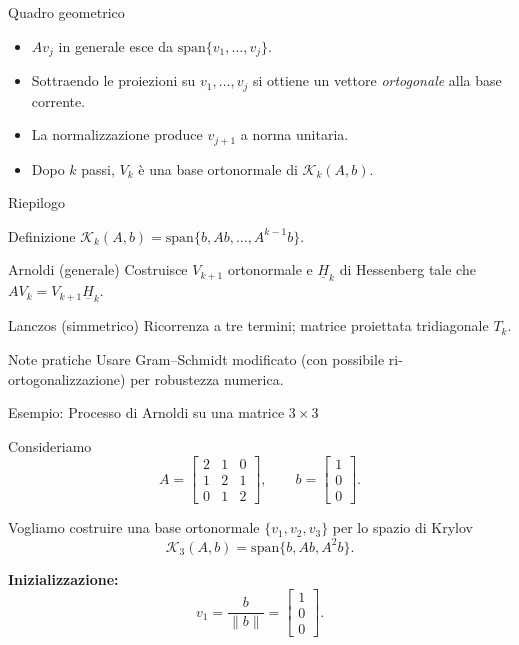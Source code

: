 \documentclass{beamer}
\begin{document}
\begin{frame}{Quadro geometrico}
\begin{itemize}
  \item $A v_j$ in generale esce da $\mathrm{span}\{v_1,\dots,v_j\}$.
  \item Sottraendo le proiezioni su $v_1,\dots,v_j$ si ottiene un vettore \emph{ortogonale} alla base corrente.
  \item La normalizzazione produce $v_{j+1}$ a norma unitaria.
  \item Dopo $k$ passi, $V_k$ è una base ortonormale di $\mathcal{K}_k(A,b)$.
\end{itemize}
\end{frame}

\begin{frame}{Riepilogo}
\begin{block}{Definizione}
$\mathcal{K}_k(A,b)=\mathrm{span}\{b,Ab,\dots,A^{k-1}b\}$.
\end{block}

\begin{block}{Arnoldi (generale)}
Costruisce $V_{k+1}$ ortonormale e $\underline H_k$ di Hessenberg tale che $A V_k = V_{k+1}\underline H_k$.
\end{block}

\begin{block}{Lanczos (simmetrico)}
Ricorrenza a tre termini; matrice proiettata tridiagonale $T_k$.
\end{block}

\begin{block}{Note pratiche}
Usare Gram–Schmidt modificato (con possibile ri-ortogonalizzazione) per robustezza numerica.
\end{block}
\end{frame}


\begin{frame}{Esempio: Processo di Arnoldi su una matrice $3\times3$}
\small

Consideriamo
\[
A=\begin{bmatrix}
2 & 1 & 0\\
1 & 2 & 1\\
0 & 1 & 2
\end{bmatrix},
\qquad
b=\begin{bmatrix}1\\0\\0\end{bmatrix}.
\]

Vogliamo costruire una base ortonormale $\{v_1,v_2,v_3\}$ per lo spazio di Krylov
\[
\mathcal{K}_3(A,b)=\text{span}\{b,Ab,A^2b\}.
\]

\textbf{Inizializzazione:}
\[
v_1 = \frac{b}{\|b\|} =
\begin{bmatrix}1\\0\\0\end{bmatrix}.
\]
\end{frame}
\end{document}
